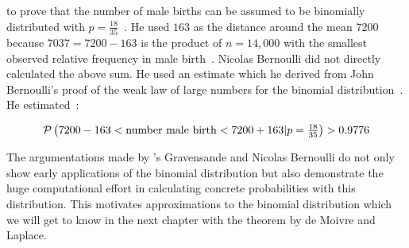 to prove that the number of male births can be assumed to be binomially distributed with $p=\tfrac{18}{35}$~\cite[pp. 281-282]{hald1}. He used $163$ as the distance around the mean $7200$ because $7037=7200-163$ is the product of $n=14,000$ with the smallest observed relative frequency in male birth~\cite[p. 282]{hald1}. Nicolas Bernoulli did not directly calculated the above sum. He used an estimate which he derived from John Bernoulli's proof of the weak law of large numbers for the binomial distribution~\cite[pp. 264-267]{hald1}. He estimated~\cite[p. 282]{hald1}:

\begin{align}
    \P{7200-163 < \text{number male birth} < 7200+163|p=\tfrac{18}{35}} > 0.9776
\end{align}

The argumentations made by 's Gravensande and Nicolas Bernoulli do not only show early applications of the binomial distribution but also demonstrate the huge computational effort in calculating concrete probabilities with this distribution. This motivates approximations to the binomial distribution which we will get to know in the next chapter with the theorem by de Moivre and Laplace.
